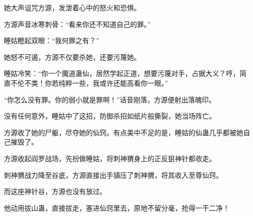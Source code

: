 \begin{this_body}
她大声诅咒方源，发泄着心中的怒火和恐惧。

方源声音冰寒刺骨：“看来你还不知道自己的罪。”

睡姑瞪起双眼：“我何罪之有？”

她怒不可遏，方源不仅要杀她，还要污蔑她。

睡姑冷笑：“你一个魔道蛊仙，居然学起正道，想要污蔑对手，占据大义？哼，简直不伦不类！你若纯粹一些，我或许还能高看你一眼。”

“你怎么没有罪。你的弱小就是罪啊！”话音刚落，方源便射出落魄印。

没有任何意外，睡姑中了这招，防御杀招如纸片般撕裂，她当场阵亡。

方源收了她的尸躯，尽夺她的仙窍。有点美中不足的是，睡姑的仙蛊几乎都被她自己摧毁了。

方源收起阎罗战场，先扮做睡姑，将刺神猬身上的正反狙神针都收走。

刺神猬战力降至谷底，方源直接出手镇压了刺神猬，将其收入至尊仙窍。

而这座神针谷，方源也没有放过。

他动用拔山蛊，直接拔走，塞进仙窍里去，原地不留分毫，抢得一干二净！

\end{this_body}

